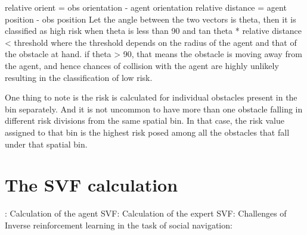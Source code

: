 relative orient = obs orientation - agent orientation
relative distance = agent position - obs position
Let the angle between the two vectors is theta, then it is classified as high risk when
theta is less than 90 and tan theta * relative distance < threshold
where the threshold depends on the radius of the agent and that of the obstacle at hand.
if theta > 90, that means the obstacle is moving away from the agent, and hence chances of collision with the agent are highly unlikely resulting in the classification of low risk.

One thing to note is the risk is calculated for individual obstacles present in the bin separately. And it is not uncommon to have more than one obstacle falling in different risk divisions from the same spatial bin. In that case, the risk value assigned to that bin is the highest risk posed among all the obstacles that fall under that spatial bin.

\section*{The SVF calculation}:
Calculation of the agent SVF:
Calculation of the expert SVF:
Challenges of Inverse reinforcement learning in the task of social navigation:



